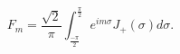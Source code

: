 \begin{equation}
F_{m}=\frac{\sqrt{2}}{\pi}\int_{\frac{-\pi}{2}}^{\frac{\pi}{2}}e^{im\sigma}J_{+}(\sigma)d\sigma.
\end{equation}

